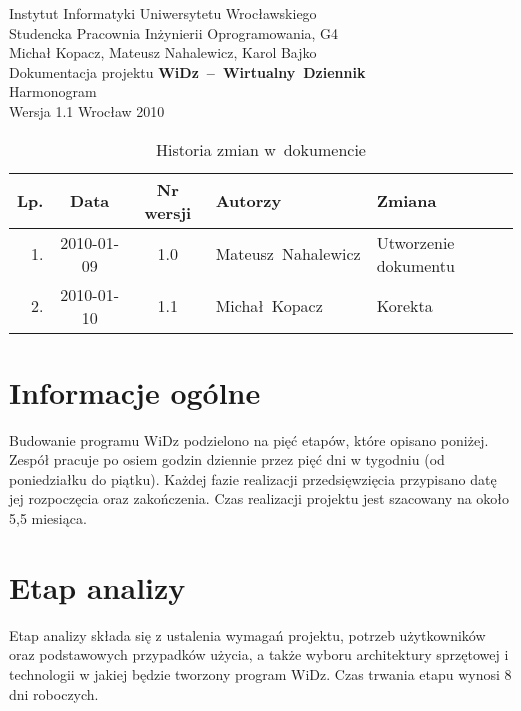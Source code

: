\documentclass[12pt,leqno,twoside]{mwart}
\begin{document}
\begin{titlepage}
\begin{center}
Instytut Informatyki Uniwersytetu Wrocławskiego \\
Studencka Pracownia Inżynierii Oprogramowania, G4 \\
\vspace{4cm}
\Large Michał Kopacz, Mateusz Nahalewicz, Karol Bajko \\
\vspace{0.5cm}
\huge Dokumentacja projektu \mbox{\textbf{WiDz -- Wirtualny Dziennik}} \\ \Large Harmonogram\\
\vspace{1cm}
\normalsize Wersja 1.1
\vfill
\normalsize Wrocław 2010
\end{center}
\end{titlepage}

\newpage

\begin{table}
	\centering
	\caption{Historia zmian w~dokumencie}
		\begin{tabular}{|r|c|c|l|l|}
		\hline
		Lp. 	& Data       & Nr wersji 	& Autorzy           		& Zmiana \\ \hline
		1.   	& 2010-01-09 & 1.0       	& \mbox{Mateusz Nahalewicz} & Utworzenie dokumentu \\ \hline
		2.   	& 2010-01-10 & 1.1       	& \mbox{Michał Kopacz} & Korekta \\ \hline
		\end{tabular}
\end{table}

\newpage

\tableofcontents

\newpage


\section{Informacje ogólne}
\noindent Budowanie programu WiDz podzielono na pięć etapów, które opisano poniżej. Zespół pracuje po osiem godzin dziennie przez pięć dni w tygodniu (od poniedziałku do piątku). Każdej fazie realizacji przedsięwzięcia przypisano datę jej rozpoczęcia oraz zakończenia. Czas realizacji projektu jest szacowany na około 5,5 miesiąca.\\


\section{Etap analizy}
\noindent Etap analizy składa się z ustalenia wymagań projektu, potrzeb użytkowników oraz podstawowych przypadków użycia, a także wyboru architektury sprzętowej i technologii w jakiej będzie tworzony program WiDz. Czas trwania etapu wynosi 8 dni roboczych.\\
\end{document}
